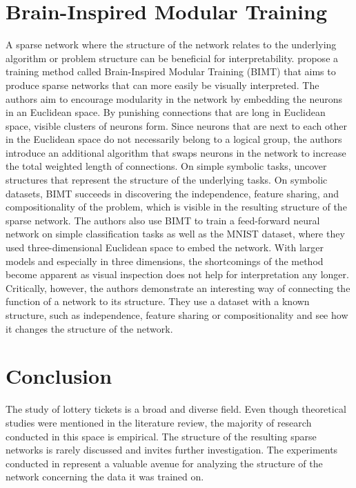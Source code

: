 \section{Brain-Inspired Modular Training}
A sparse network where the structure of the network relates to the underlying algorithm or problem structure can be beneficial for interpretability.
\textcite{BIMT} propose a training method called Brain-Inspired Modular Training (BIMT) that aims to produce sparse networks that can more easily be visually interpreted.
The authors aim to encourage modularity in the network by embedding the neurons in an Euclidean space.
By punishing connections that are long in Euclidean space, visible clusters of neurons form. 
Since neurons that are next to each other in the Euclidean space do not necessarily belong to a logical group, the authors introduce an additional algorithm that swaps neurons in the network to increase the total weighted length of connections.
On simple symbolic tasks, \autocite{BIMT} uncover structures that represent the structure of the underlying tasks.
On symbolic datasets, BIMT succeeds in discovering the independence, feature sharing, and compositionality of the problem, which is visible in the resulting structure of the sparse network.
The authors also use BIMT to train a feed-forward neural network on simple classification tasks as well as the MNIST dataset, where they used three-dimensional Euclidean space to embed the network.
With larger models and especially in three dimensions, the shortcomings of the method become apparent as visual inspection does not help for interpretation any longer.
Critically, however, the authors demonstrate an interesting way of connecting the function of a network to its structure.
They use a dataset with a known structure, such as independence, feature sharing or compositionality and see how it changes the structure of the network.

\section{Conclusion}
The study of lottery tickets is a broad and diverse field. 
Even though theoretical studies were mentioned in the literature review, the majority of research conducted in this space is empirical.
The structure of the resulting sparse networks is rarely discussed and invites further investigation.
The experiments conducted in \autocite{BIMT} represent a valuable avenue for analyzing the structure of the network concerning the data it was trained on.
